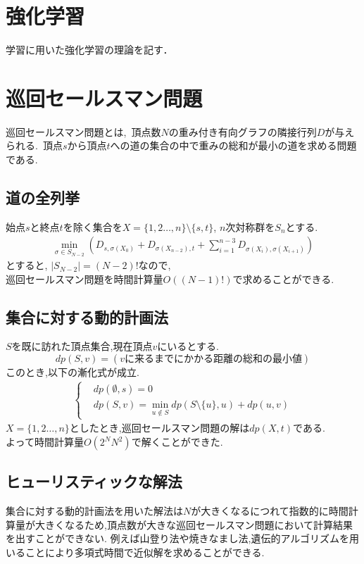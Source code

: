 \documentclass[a4paper,12pt]{jsreport}
\theoremstyle{definition}
\begin{document}
\chapter{強化学習}
学習に用いた強化学習の理論を記す．
\section{} 



\chapter{巡回セールスマン問題}
巡回セールスマン問題とは,\ 頂点数$N$の重み付き有向グラフの隣接行列$D$が与えられる.\ 頂点$s$から頂点$t$への道の集合の中で重みの総和が最小の道を求める問題である.
\section{道の全列挙}
始点$s$と終点$t$を除く集合を$X=\{1,2\ldots ,n\}\setminus\{s,t\}$, $n$次対称群を$S_n$とする.
\begin{eqnarray}
    \min_{\sigma\in S_{N-2}}
    \left(D_{s,\sigma(X_0)} + D_{\sigma(X_{n-2}),t} +
    \sum_{i=1}^{n-3}
        D_{\sigma(X_i),\sigma(X_{i+1})} 
    \right)
\end{eqnarray}
とすると, $|S_{N-2}|=(N-2)!$なので,\\ 巡回セールスマン問題を時間計算量$O((N-1)!)$で求めることができる.

\section{集合に対する動的計画法}
$S$を既に訪れた頂点集合,現在頂点$v$にいるとする.
$$dp(S,v)=(vに来るまでにかかる距離の総和の最小値)$$
このとき,以下の漸化式が成立.
\begin{eqnarray}
    \begin{cases}
        & dp(\emptyset,s)=0\\
        & dp(S,v)=\min_{u \notin S}dp(S\setminus\{u\},u)+dp(u,v)
    \end{cases}
\end{eqnarray}
$X=\{1,2\ldots ,n\}$としたとき,巡回セールスマン問題の解は$dp(X,t)$である.\\
よって時間計算量$O(2^NN^2)$で解くことができた.
\section{ヒューリスティックな解法}
集合に対する動的計画法を用いた解法は$N$が大きくなるにつれて指数的に時間計算量が大きくなるため,頂点数が大きな巡回セールスマン問題において計算結果を出すことができない.
例えば山登り法や焼きなまし法,遺伝的アルゴリズムを用いることにより多項式時間で近似解を求めることができる.
\end{document}
